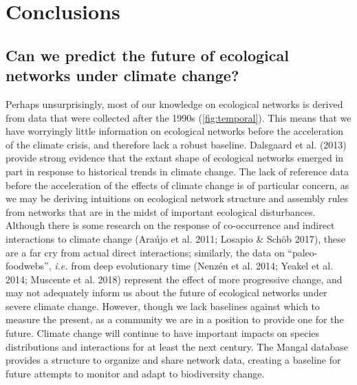 \hypertarget{conclusions}{%
\section{Conclusions}\label{conclusions}}

\hypertarget{can-we-predict-the-future-of-ecological-networks-under-climate-change}{%
\subsection{Can we predict the future of ecological networks under
climate
change?}\label{can-we-predict-the-future-of-ecological-networks-under-climate-change}}

Perhaps unsurprisingly, most of our knowledge on ecological networks is
derived from data that were collected after the 1990s
(\cref{fig:temporal}). This means that we have worryingly little
information on ecological networks before the acceleration of the
climate crisis, and therefore lack a robust baseline. Dalsgaard et al.
(2013) provide strong evidence that the extant shape of ecological
networks emerged in part in response to historical trends in climate
change. The lack of reference data before the acceleration of the
effects of climate change is of particular concern, as we may be
deriving intuitions on ecological network structure and assembly rules
from networks that are in the midst of important ecological
disturbances. Although there is some research on the response of
co-occurrence and indirect interactions to climate change (Araújo et al.
2011; Losapio \& Schöb 2017), these are a far cry from actual direct
interactions; similarly, the data on ``paleo-foodwebs'', \emph{i.e.}
from deep evolutionary time (Nenzén et al. 2014; Yeakel et al. 2014;
Muscente et al. 2018) represent the effect of more progressive change,
and may not adequately inform us about the future of ecological networks
under severe climate change. However, though we lack baselines against
which to measure the present, as a community we are in a position to
provide one for the future. Climate change will continue to have
important impacts on species distributions and interactions for at least
the next century. The Mangal database provides a structure to organize
and share network data, creating a baseline for future attempts to
monitor and adapt to biodiversity change.

